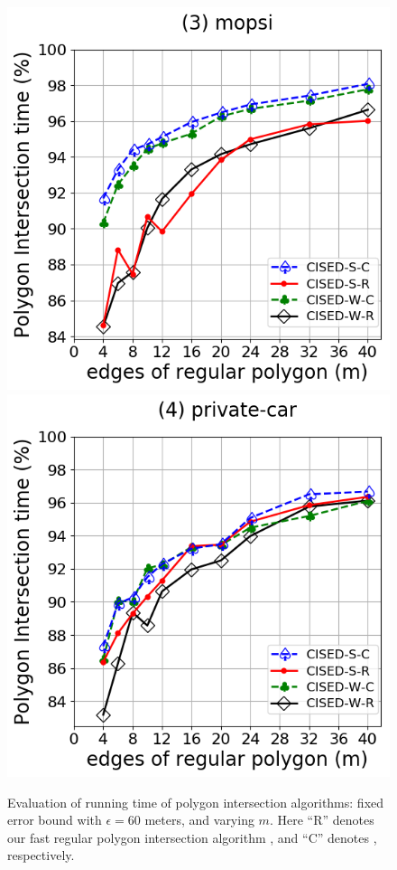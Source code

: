 {\begin{figure}[tb!]
	\includegraphics[scale = 0.290]{Figures/Exp-M-poly-time-ratio-mopsi.png}\hspace{1ex}
	\includegraphics[scale = 0.290]{Figures/Exp-M-poly-time-ratio-private.png}
	\caption{\small Evaluation of running time of polygon intersection algorithms: fixed error bound with $\epsilon=60$ meters, and varying $m$. Here ``R'' denotes our fast regular polygon intersection algorithm \rpia, and ``C'' denotes \cpia, respectively.}
	\label{fig:m-poly-time}
\end{figure}


}
